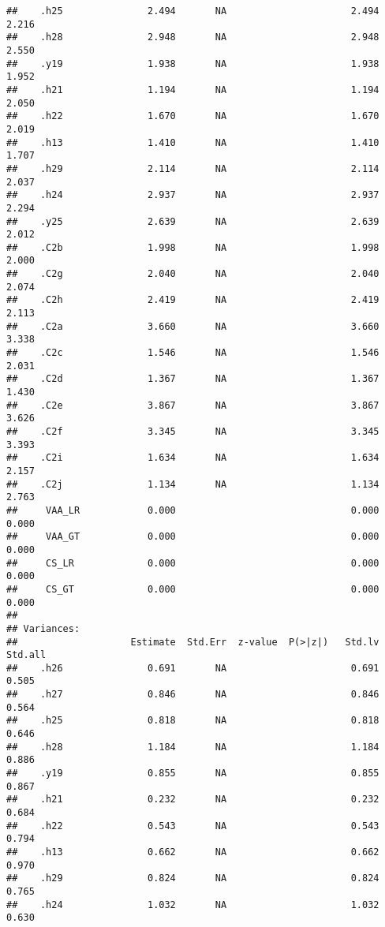 \documentclass[
]{article}
\begin{document}
\begin{verbatim}
##    .h25               2.494       NA                      2.494    2.216
##    .h28               2.948       NA                      2.948    2.550
##    .y19               1.938       NA                      1.938    1.952
##    .h21               1.194       NA                      1.194    2.050
##    .h22               1.670       NA                      1.670    2.019
##    .h13               1.410       NA                      1.410    1.707
##    .h29               2.114       NA                      2.114    2.037
##    .h24               2.937       NA                      2.937    2.294
##    .y25               2.639       NA                      2.639    2.012
##    .C2b               1.998       NA                      1.998    2.000
##    .C2g               2.040       NA                      2.040    2.074
##    .C2h               2.419       NA                      2.419    2.113
##    .C2a               3.660       NA                      3.660    3.338
##    .C2c               1.546       NA                      1.546    2.031
##    .C2d               1.367       NA                      1.367    1.430
##    .C2e               3.867       NA                      3.867    3.626
##    .C2f               3.345       NA                      3.345    3.393
##    .C2i               1.634       NA                      1.634    2.157
##    .C2j               1.134       NA                      1.134    2.763
##     VAA_LR            0.000                               0.000    0.000
##     VAA_GT            0.000                               0.000    0.000
##     CS_LR             0.000                               0.000    0.000
##     CS_GT             0.000                               0.000    0.000
## 
## Variances:
##                    Estimate  Std.Err  z-value  P(>|z|)   Std.lv  Std.all
##    .h26               0.691       NA                      0.691    0.505
##    .h27               0.846       NA                      0.846    0.564
##    .h25               0.818       NA                      0.818    0.646
##    .h28               1.184       NA                      1.184    0.886
##    .y19               0.855       NA                      0.855    0.867
##    .h21               0.232       NA                      0.232    0.684
##    .h22               0.543       NA                      0.543    0.794
##    .h13               0.662       NA                      0.662    0.970
##    .h29               0.824       NA                      0.824    0.765
##    .h24               1.032       NA                      1.032    0.630

\end{verbatim}
\end{document}
